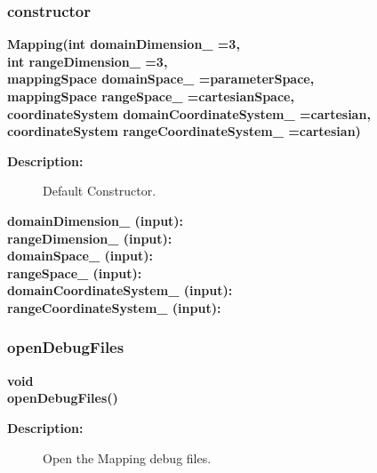 \subsubsection{constructor}
 
\newlength{\MappingIncludeArgIndent}
\begin{flushleft} \textbf{%
\settowidth{\MappingIncludeArgIndent}{Mapping(}%
Mapping(int domainDimension\_  =3, \\ 
\hspace{\MappingIncludeArgIndent}int rangeDimension\_  =3, \\ 
\hspace{\MappingIncludeArgIndent}mappingSpace domainSpace\_  =parameterSpace,\\ 
\hspace{\MappingIncludeArgIndent}mappingSpace rangeSpace\_  =cartesianSpace,\\ 
\hspace{\MappingIncludeArgIndent}coordinateSystem domainCoordinateSystem\_  =cartesian,\\ 
\hspace{\MappingIncludeArgIndent}coordinateSystem rangeCoordinateSystem\_  =cartesian)
}\end{flushleft}
\begin{description}
\item[{\bf Description:}]  Default Constructor.
 
\item[{\bf domainDimension\_ (input):}]  
\item[{\bf rangeDimension\_ (input):}] 
\item[{\bf domainSpace\_ (input):}] 
\item[{\bf rangeSpace\_ (input):}] 
\item[{\bf domainCoordinateSystem\_ (input):}] 
\item[{\bf rangeCoordinateSystem\_ (input):}] 
\end{description}
\subsubsection{openDebugFiles}
 
\begin{flushleft} \textbf{%
void  \\ 
\settowidth{\MappingIncludeArgIndent}{openDebugFiles(}%
openDebugFiles()
}\end{flushleft}
\begin{description}
\item[{\bf Description:}] 
    Open the Mapping debug files.
\end{description}
